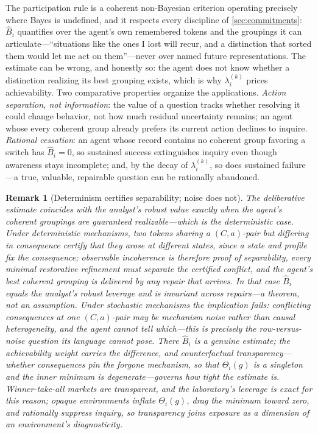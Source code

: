 \documentclass[11pt]{article}
\newtheorem{remark}[assumption]{Remark}
\theoremstyle{definition}
\begin{document}
The participation rule is a coherent non-Bayesian criterion operating
precisely where Bayes is undefined, and it respects every discipline of
\cref{sec:commitments}: $\widehat B_i$ quantifies over the agent's own
remembered tokens and the groupings it can articulate---``situations like the
ones I lost will recur, and a distinction that sorted them would let me act on
them''---never over named future representations.  The estimate can be wrong,
and honestly so: the agent does not know whether a distinction realizing its
best grouping exists, which is why $\lambda_i^{(k)}$ prices achievability.  Two
comparative properties organize the applications.  \emph{Action separation,
not information}: the value of a question tracks whether resolving it could
change behavior, not how much residual uncertainty remains; an agent whose
every coherent group already prefers its current action declines to inquire.
\emph{Rational cessation}: an agent whose record contains no coherent group
favoring a switch has $\widehat B_i=0$, so sustained success extinguishes
inquiry even though awareness stays incomplete; and, by the decay of
$\lambda_i^{(k)}$, so does sustained failure---a true, valuable, repairable
question can be rationally abandoned.

\begin{remark}[Determinism certifies separability; noise does not]
\label{rem:certification}
The deliberative estimate coincides with the analyst's robust value exactly
when the agent's coherent groupings are guaranteed realizable---which is the
deterministic case.  Under deterministic mechanisms, two tokens sharing a
$(C,a)$-pair but differing in consequence \emph{certify} that they arose at
different states, since a state and profile fix the consequence; observable
incoherence is therefore proof of separability, every minimal restorative
refinement must separate the certified conflict, and the agent's best coherent
grouping is delivered by any repair that arrives.  In that case $\widehat B_i$
equals the analyst's robust leverage and is invariant across repairs---a
theorem, not an assumption.  Under stochastic mechanisms the implication
fails: conflicting consequences at one $(C,a)$-pair may be mechanism noise
rather than causal heterogeneity, and the agent cannot tell which---this is
precisely the row-versus-noise question its language cannot pose.  There
$\widehat B_i$ is a genuine estimate; the achievability weight carries the
difference, and \emph{counterfactual transparency}---whether consequences pin
the forgone mechanism, so that $\Theta_i(g)$ is a singleton and the inner
minimum is degenerate---governs how tight the estimate is.  Winner-take-all
markets are transparent, and the laboratory's leverage is exact for this
reason; opaque environments inflate $\Theta_i(g)$, drag the minimum toward
zero, and rationally suppress inquiry, so transparency joins exposure as a
dimension of an environment's diagnosticity.
\end{remark}
\end{document}
